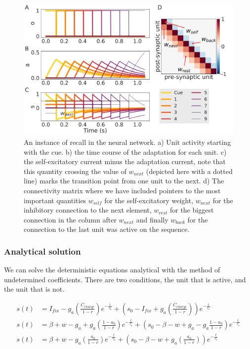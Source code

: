 \documentclass[10pt,a4paper]{article}
\begin{document}
\begin{figure}[H]
\centering
\includegraphics[scale=0.25]{simple_bcpnn_recall.pdf}
\caption{An instance of recall in the neural network. a) Unit activity starting with the cue. b) the time course of the adaptation for each unit. c) the self-excitatory current minus the adaptation current, note that this quantity crossing the value of $w_{next}$ (depicted here with a dotted line) marks the transition point from one unit to the next. d) The connectivity matrix where we have included pointers to the most important quantities $w_{self}$ for the self-excitatory weight, $w_{next}$ for the inhibitory connection to the next element, $w_{rest}$ for the biggest connection in the column after $w_{next}$ and finally $w_{back}$ for the connection to the last unit was active on the sequence.}
\label{fig:recall}
\end{figure}

\subsubsection{Analytical solution}
We can solve the deterministic equations analytical with the method of undetermined coefficients. There are two conditions, the unit that is active, and the unit that is not. 


\begin{align*} 
s(t) &= I_{fix} - g_a\left(\frac{C_{charge}}{1 - r} \right) e^{-\frac{t}{\tau_a}} + \left(s_0 - I_{fix} + g_a \left( \frac{C_{charge}}{1 - r}\right)\right)e^{-\frac{t}{\tau_s}} \\
s(t) &= \beta + w - g_a + g_a \left(\frac{1 - a_0}{1 - r}\right) e^{-\frac{t}{\tau_a}} + \left(s_0 - \beta - w + g_a - g_a \frac{1 - a_0}{1 - r}\right) e^{-\frac{t}{\tau_s}}  \\ 
s(t) &= \beta + w - g_a \left( \frac{a_0}{1 - r} \right) e^{-\frac{t}{\tau_a}} + \left(s_0 - \beta  - w  + g_a \left( \frac{a_0}{1 - r} \right) \right) e^{-\frac{t}{\tau_s}} 
\end{align*}
\end{document}

